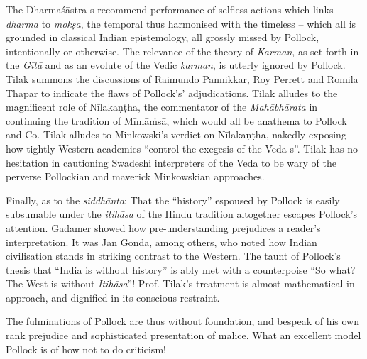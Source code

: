 \vskip 2pt

The Dharmaśāstra-s recommend performance of selfless actions which links \textit{dharma} to \textit{mokṣa}, the temporal thus harmonised with the timeless – which all is grounded in classical Indian epistemology, all grossly missed by Pollock, intentionally or otherwise. The relevance of the theory of \textit{Karman}, as set forth in the \textit{Gītā} and as an evolute of the Vedic \textit{karman}, is utterly ignored by Pollock. Tilak summons the discussions of Raimundo Pannikkar, Roy Perrett and Romila Thapar to indicate the flaws of Pollock’s’ adjudications. Tilak alludes to the magnificent role of Nīlakaṇṭha, the commentator of the \textit{Mahābhārata} in continuing the tradition of Mīmāṁsā, which would all be anathema to Pollock and Co. Tilak alludes to Minkowski’s verdict on Nīlakaṇṭha, nakedly exposing how tightly Western academics ``control the exegesis of the Veda-s”. Tilak has no hesitation in cautioning Swadeshi interpreters of the Veda to be wary of the perverse Pollockian and maverick Minkowskian approaches.

\vskip 2pt

Finally, as to the \textit{siddhānta}: That the “history” espoused by Pollock is easily subsumable under the \textit{itihāsa} of the Hindu tradition altogether escapes Pollock's attention. Gadamer showed how pre-understanding prejudices a reader’s interpretation. It was Jan Gonda, among others, who noted how Indian civilisation stands in striking contrast to the Western. The taunt of Pollock’s thesis that “India is without history” is ably met with a counterpoise “So what? The West is without \textit{Itihāsa}”! Prof. Tilak’s treatment is almost mathematical in approach, and dignified in its conscious restraint. 

\vskip 2pt

The fulminations of Pollock are thus without foundation, and bespeak of his own rank prejudice and sophisticated presentation of malice. What an excellent model Pollock is of how not to do criticism!

\vskip 2pt

